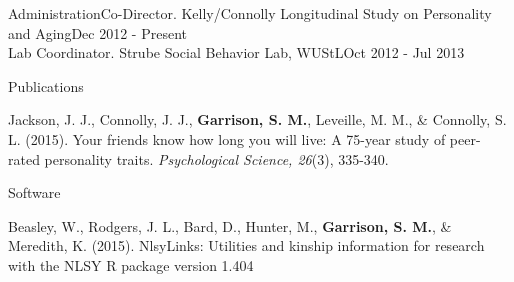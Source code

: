 \documentclass {resume}
\newcommand{\R}{\textup{\textrm{R}}\xspace}
\newcommand{\meb}{{\bf Garrison, S. M.}\xspace}
\newlength{\wideitemsep}
\let\olditem\item
\renewcommand{\item}{\setlength{\itemsep}{\wideitemsep}\olditem}
\begin{document}
\begin{samepage}\begin{rSection}{\textrm{Administration}}Co-Director. Kelly/Connolly Longitudinal Study on Personality and Aging\hfill Dec 2012 - Present\smallskip\\
Lab Coordinator. Strube Social Behavior Lab,  WUStL\hfill Oct 2012 - Jul 2013
\end{rSection}\end{samepage}%


\begin{rSection}{\textrm{Publications}}%
\begin{etaremune}\item Jackson, J. J., Connolly, J. J., \meb, Leveille, M. M., \& Connolly, S. L. (2015). Your friends know how long you will live: A 75-year study of peer-rated personality traits. \textit{Psychological Science, 26}(3),  335-340.\\ \href{http://pss.sagepub.com/content/early/2015/01/12/0956797614561800.full}{\color{blue}{doi:10.1177/0956797614561800}}
\end{etaremune}\end{rSection}\vspace{-4mm}

\begin{rSection}{\textrm{Software}}%
\begin{etaremune}\item  Beasley, W., Rodgers, J. L., Bard, D., Hunter, M., \meb, \& Meredith, K. (2015). NlsyLinks: Utilities and kinship information for research with the NLSY \R package version 1.404 \href{http://liveoak.github.io/NlsyLinks}{\color{blue}{http://liveoak.github.io/NlsyLinks}}\end{etaremune}\end{rSection}%
\end{document}
